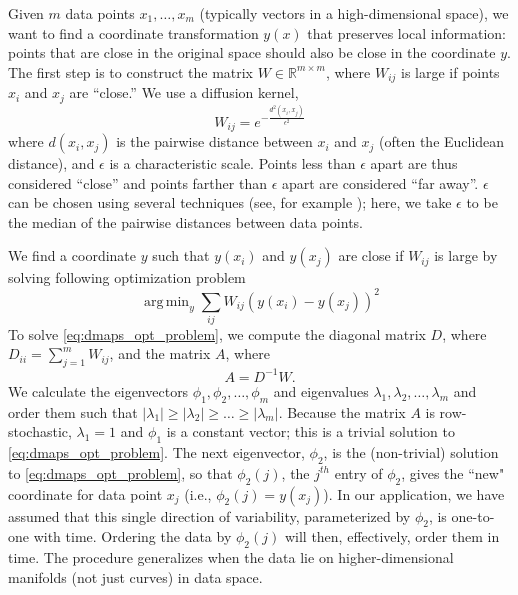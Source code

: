 \documentclass{pnastwo}
\DeclareMathOperator*{\argmin}{arg\,min}
\begin{document}
\begin{article}
\begin{materials}
Given $m$ data points $x_1, \dots, x_m$ (typically vectors in a high-dimensional space), we want to find a coordinate transformation $y(x)$ that preserves local information: points that are close in the original space should also be close in the coordinate $y$.
%
The first step is to construct the matrix $W \in \mathbb{R}^{m \times m}$, where $W_{ij}$ is large if points $x_i$ and $x_j$ are ``close.''
%
We use a diffusion kernel,
\begin{equation} \label{eq:dmaps_W}
W_{ij} = e^{ -\frac{d^2(x_i, x_j)}{\epsilon^2}}
\end{equation}
where $d(x_i, x_j)$ is the pairwise distance between $x_i$ and $x_j$ (often the Euclidean distance), and $\epsilon$ is a characteristic scale.
%
Points less than $\epsilon$ apart are thus considered ``close'' and points farther than $\epsilon$ apart are considered ``far away''.
%
$\epsilon$ can be chosen using several techniques (see, for example \cite{coifman2008graph}); here, we take $\epsilon$ to be the median of the pairwise distances between data points.

We find a coordinate $y$ such that $y(x_i)$ and $y(x_j)$ are close if $W_{ij}$ is large by solving following optimization problem \cite{Belkin2003}
\begin{equation} \label{eq:dmaps_opt_problem}
\argmin_{y} \sum_{ij} W_{ij} (y(x_i) - y(x_j))^2
\end{equation}
%
To solve \eqref{eq:dmaps_opt_problem}, we compute the diagonal matrix $D$, where $D_{ii} = \sum_{j=1}^{m} W_{ij}$, and the matrix $A$, where
\begin{equation} \label{eq:dmaps_A}
A = D^{-1} W.
\end{equation}
%
We calculate the eigenvectors $\phi_1, \phi_2, \dots, \phi_m$ and eigenvalues $\lambda_1, \lambda_2, \dots, \lambda_m$ and order them such that $|\lambda_1| \ge |\lambda_2| \ge \dots \ge |\lambda_m|$.
%
%
Because the matrix $A$ is row-stochastic, $\lambda_1=1$ and $\phi_1$ is a constant vector; this is a trivial solution to \eqref{eq:dmaps_opt_problem}.
%
%
The next eigenvector, $\phi_2$, is the (non-trivial) solution to \eqref{eq:dmaps_opt_problem}, so that $\phi_2(j)$, the $j^{th}$ entry of $\phi_2$, gives the ``new" coordinate for data point $x_j$ (i.e., $\phi_2(j) = y(x_j)$).
%
In our application, we have assumed that this single direction of variability, parameterized by $\phi_2$, is one-to-one with time.
%
Ordering the data by $\phi_2(j)$ will then, effectively, order them in time.
%
The procedure generalizes when the data lie on higher-dimensional manifolds (not just curves) in data space.


\end{materials}
\end{article}
\end{document}
